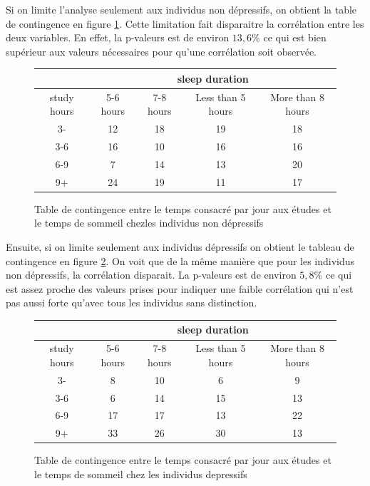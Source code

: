 Si on limite l'analyse seulement aux individus non dépressifs, on obtient la table de contingence en figure \ref{tab:contTableStudySleepNonDepressive}.
Cette limitation fait disparaitre la corrélation entre les deux variables. 
En effet, la p-valeurs est de environ $13,6\%$ ce qui est bien supérieur aux valeurs nécessaires pour qu'une corrélation soit observée.
   
\begin{figure}[!h]
    \begin{center}
        \begin{tabular}{|c|c|c|c|c|}
        \hline 
        & \multicolumn{4}{|c|}{sleep duration}\\ 
        \hline
        study hours & 5-6 hours & 7-8 hours & Less than 5 hours & More than 8 hours\\ 
        \hline 
        3- & 12 & 18 & 19 & 18\\ 
        \hline 
        3-6 & 16 & 10 & 16 & 16\\ 
        \hline 
        6-9 & 7 & 14 & 13 & 20\\ 
        \hline 
        9+ & 24 & 19 & 11 & 17 \\ 
        \hline
        \end{tabular}
    \end{center}
    \caption{Table de contingence entre le temps consacré par jour aux études et le temps de sommeil chezles individus non dépressifs}
    \label{tab:contTableStudySleepNonDepressive}
\end{figure}

Ensuite, si on limite seulement aux individus dépressifs on obtient le tableau de contingence en figure \ref{tab:contTableStudySleepDepressive}.
On voit que de la même manière que pour les individus non dépressifs, la corrélation disparait.
La p-valeurs est de environ $5,8\%$ ce qui est assez proche des valeurs prises pour indiquer une faible corrélation qui n'est pas aussi forte qu'avec tous les individus sans distinction. 

\begin{figure}[!h]
    \begin{center}
    \begin{tabular}{|c|c|c|c|c|}
        \hline 
        & \multicolumn{4}{|c|}{sleep duration}\\ 
        \hline
        study hours & 5-6 hours & 7-8 hours & Less than 5 hours & More than 8 hours\\ 
        \hline 
        3- & 8 & 10 & 6 & 9\\ 
        \hline 
        3-6 & 6 & 14 & 15 & 13\\ 
        \hline 
        6-9 & 17 & 17 & 13 & 22\\ 
        \hline 
        9+ & 33 & 26 & 30 & 13 \\ 
        \hline
    \end{tabular}
    \end{center}
    \caption{Table de contingence entre le temps consacré par jour aux études et le temps de sommeil chez les individus depressifs}
    \label{tab:contTableStudySleepDepressive}
\end{figure}


